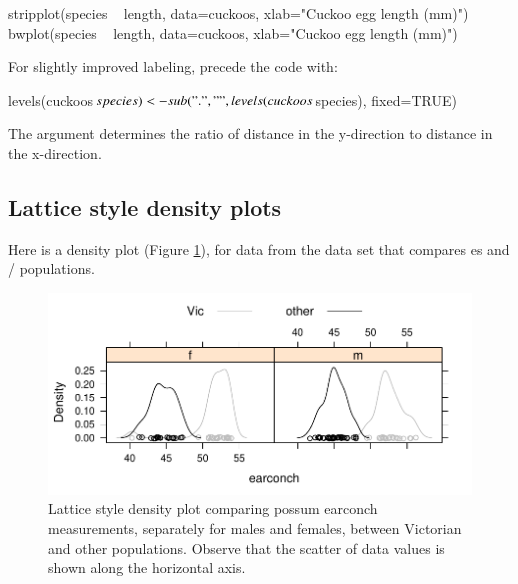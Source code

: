 \begin{Schunk}
\begin{Sinput}
stripplot(species ~ length, data=cuckoos,
          xlab="Cuckoo egg length (mm)")
bwplot(species ~ length, data=cuckoos,
       xlab="Cuckoo egg length (mm)")
\end{Sinput}
\end{Schunk}
\begin{marginfigure}[-36pt]
For slightly improved labeling, precede the code with:
\begin{Schunk}
\begin{Sinput}
levels(cuckoos$species) <-
 sub(".", " ",
  levels(cuckoos$species),
  fixed=TRUE)
\end{Sinput}
\end{Schunk}
\end{marginfigure}
The  argument determines the ratio of distance
in the y-direction to distance in the x-direction.

\subsection*{Lattice style density plots}
Here is a density plot (Figure \ref{fig:possumdens}), for data from
the  data set that compares es
and / populations.
\begin{figure}
\begin{center}
\begin{Schunk}


\centerline{\includegraphics[width=\textwidth]{figs/07-lattice-density-1} }

\end{Schunk}
\end{center}
  \caption{Lattice style density plot comparing possum earconch
    measurements, separately for males and females, between Victorian
    and other populations. Observe that the scatter of data values is
shown along the horizontal axis.}\label{fig:possumdens}
\vspace*{-36pt}
\end{figure}

